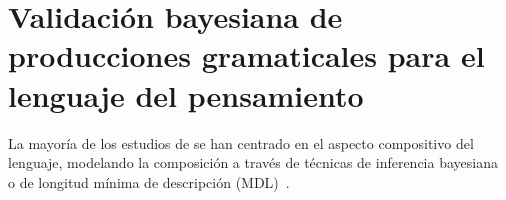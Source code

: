 

\chapter{Validación bayesiana de producciones gramaticales para el lenguaje del pensamiento}\label{chapter:PO}



La mayoría de los estudios de \lot se han centrado en el aspecto compositivo del lenguaje, modelando la composición a través de técnicas de inferencia bayesiana~\cite{tenenbaum2011grow} o de longitud mínima de descripción (MDL)~\cite{amalric2017language,goldsmith2002probabilistic,romano2013language,goldsmith2001unsupervised}.


